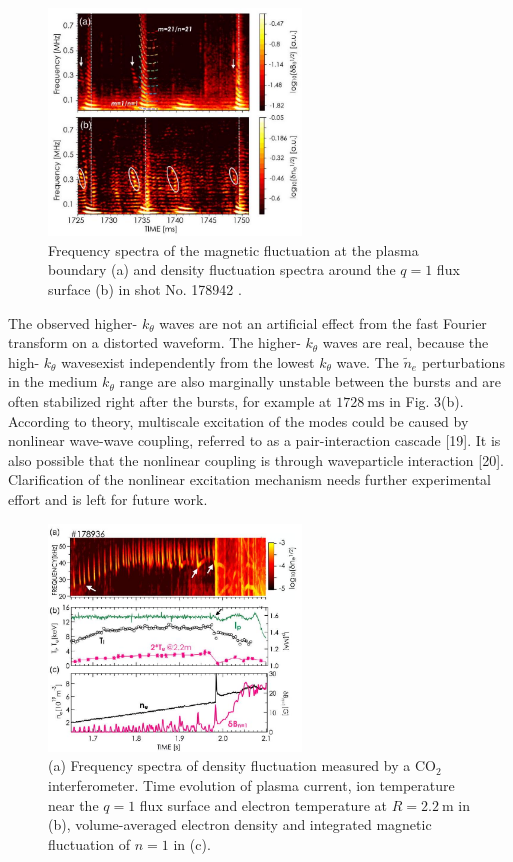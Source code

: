 \documentclass[oneside,onecolumn]{article}
\begin{document}
\begin{sloppypar}
 \begin{figure}[htbp]
 	\centering
 	\includegraphics[max width=0.6\textwidth,max height=1.0\textheight]{2023_06_19_f8dbb752866ca158c73eg-3(1)}
 	\caption{Frequency spectra of the magnetic fluctuation at the plasma boundary (a) and density fluctuation spectra around the $q=1$ flux surface (b) in shot No. 178942 .}
 	\label{figure3}
 \end{figure}
 
 
 The observed higher- $k_{\theta}$ waves are not an artificial effect from the fast Fourier transform on a distorted waveform. The higher- $k_{\theta}$ waves are real, because the high- $k_{\theta}$ wavesexist independently from the lowest $k_{\theta}$ wave. The $\tilde{n}_{e}$ perturbations in the medium $k_{\theta}$ range are also marginally unstable between the bursts and are often stabilized right after the bursts, for example at $1728 \mathrm{~ms}$ in Fig. 3(b). According to theory, multiscale excitation of the modes could be caused by nonlinear wave-wave coupling, referred to as a pair-interaction cascade [19]. It is also possible that the nonlinear coupling is through waveparticle interaction [20]. Clarification of the nonlinear excitation mechanism needs further experimental effort and is left for future work.
 \begin{figure}[htbp]
 	\centering
 	\includegraphics[max width=0.6\textwidth,max height=1.0\textheight]{2023_06_19_f8dbb752866ca158c73eg-3}
 	\caption{(a) Frequency spectra of density fluctuation measured by a $\mathrm{CO}_{2}$ interferometer. Time evolution of plasma current, ion temperature near the $q=1$ flux surface and electron temperature at $R=2.2 \mathrm{~m}$ in (b), volume-averaged electron density and integrated magnetic fluctuation of $n=1$ in (c).}
 	\label{figure4}
 \end{figure}
 

\end{sloppypar}
\end{document}
